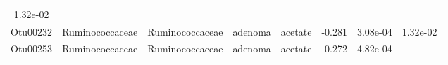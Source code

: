 \documentclass[11pt,]{article}
\begin{document}
\begin{longtable}[]{@{}cccccccc@{}}
\begin{minipage}[t]{0.08\columnwidth}
1.32e-02\strut
\end{minipage}\tabularnewline
\begin{minipage}[t]{0.08\columnwidth}\centering\strut
Otu00232\strut
\end{minipage} & \begin{minipage}[t]{0.15\columnwidth}\centering\strut
Ruminococcaceae\strut
\end{minipage} & \begin{minipage}[t]{0.15\columnwidth}\centering\strut
Ruminococcaceae\strut
\end{minipage} & \begin{minipage}[t]{0.08\columnwidth}\centering\strut
adenoma\strut
\end{minipage} & \begin{minipage}[t]{0.09\columnwidth}\centering\strut
acetate\strut
\end{minipage} & \begin{minipage}[t]{0.07\columnwidth}\centering\strut
-0.281\strut
\end{minipage} & \begin{minipage}[t]{0.08\columnwidth}\centering\strut
3.08e-04\strut
\end{minipage} & \begin{minipage}[t]{0.08\columnwidth}\centering\strut
1.32e-02\strut
\end{minipage}\tabularnewline
\begin{minipage}[t]{0.08\columnwidth}\centering\strut
Otu00253\strut
\end{minipage} & \begin{minipage}[t]{0.15\columnwidth}\centering\strut
Ruminococcaceae\strut
\end{minipage} & \begin{minipage}[t]{0.15\columnwidth}\centering\strut
Ruminococcaceae\strut
\end{minipage} & \begin{minipage}[t]{0.08\columnwidth}\centering\strut
adenoma\strut
\end{minipage} & \begin{minipage}[t]{0.09\columnwidth}\centering\strut
acetate\strut
\end{minipage} & \begin{minipage}[t]{0.07\columnwidth}\centering\strut
-0.272\strut
\end{minipage} & \begin{minipage}[t]{0.08\columnwidth}\centering\strut
4.82e-04\strut
\end{minipage} & \begin{minipage}[t]{0.08\columnwidth}\centering\strut

\end{minipage}
\end{longtable}
\end{document}
